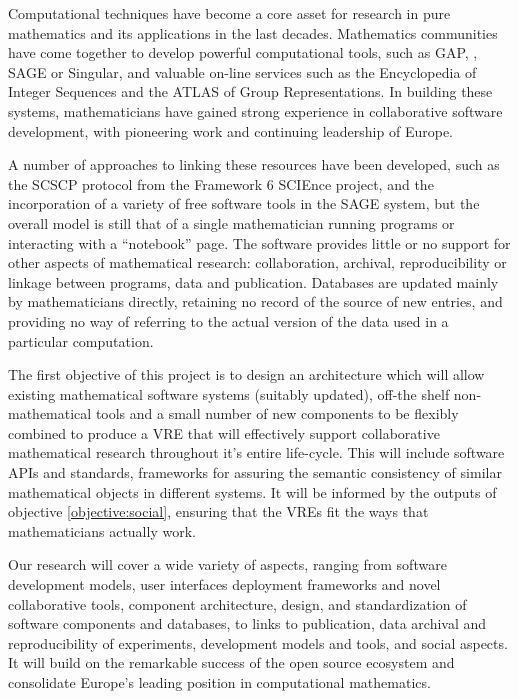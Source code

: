 \documentclass[noworkareas,deliverables,keys]{euproposal}                  %
\begin{document}
\begin{proposal}
Computational techniques have become a core asset for research in pure
  mathematics and its applications in the last decades. Mathematics
  communities have come together to develop powerful computational
  tools, such as GAP, \PariGP, SAGE or Singular, and valuable on-line
  services such as the Encyclopedia of Integer Sequences and the ATLAS
  of Group Representations.  In building these systems, 
  mathematicians have gained strong
  experience in collaborative software development, with pioneering
  work and continuing leadership of Europe.

A number of approaches to linking these resources have been developed,
such as the SCSCP protocol from the Framework 6 SCIEnce project, and
the incorporation of a variety of free software tools in the SAGE
system, but the overall model is still that of a single mathematician
running programs or interacting with a ``notebook''
page. The software provides little or no support for other aspects of
mathematical research: collaboration,
archival, reproducibility or linkage between programs, data and
publication. Databases are updated mainly by mathematicians directly,
retaining no record of the source of new entries, and providing no way
of referring to the actual version of the data used in a particular
computation.

The first objective of this project is to design an architecture which
will allow existing mathematical software systems (suitably updated), 
off-the shelf non-mathematical tools and a small number of new
components to be flexibly combined to produce a VRE that will
effectively support collaborative mathematical research throughout
it's entire life-cycle. This will include software APIs and standards,
frameworks for assuring the semantic consistency of similar
mathematical objects in different systems.  It will be informed by the
outputs of objective \ref{objective:social}, ensuring that the VREs
fit the ways that mathematicians actually work.


Our research will cover a wide variety of aspects, ranging from
software development models, user interfaces   deployment frameworks and novel collaborative tools,
component architecture, design, and standardization of software
components and databases, to links to publication, data archival and
reproducibility of experiments, development models and tools, and
social aspects. It will build on the remarkable success of the open
source ecosystem and consolidate Europe's leading position in
computational mathematics.


\end{proposal}
\end{document}
